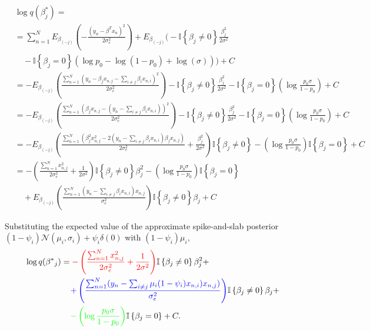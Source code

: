 \begingroup
\scriptsize
\begin{align}
    &\log q(\beta^{*}_j) = \nonumber \\
    &= \sum_{n=1}^N E_{\beta_{(-j)}} \left( - \frac{(y_n - \beta^T x_n)^2}{2 \sigma_e^2} \right) + E_{\beta_{(-j)}} \bigg( - \mathbb{I}\left\{\beta_j \ne 0\right\} \frac{\beta_j^2}{2\sigma^2} \nonumber \\
    &\quad - \mathbb{I}\left\{\beta_j = 0\right\} \left(\log p_0 - \log (1-p_0) + \log(\sigma) \right)\bigg) + C \nonumber \\
    &= - E_{\beta_{(-j)}} \left( \frac{\sum_{n=1}^N (y_n - \beta_j x_{n,j} - \sum_{i \ne j} \beta_i x_{n,i})^2}{2 \sigma_e^2} \right)  - \mathbb{I}\left\{\beta_j \ne 0\right\} \frac{\beta_j^2}{2\sigma^2} - \mathbb{I}\left\{\beta_j = 0\right\} \left(\log \frac{p_0 \sigma}{1-p_0} \right) + C \nonumber \\
    &= - E_{\beta_{(-j)}} \left( \frac{\sum_{n=1}^N (\beta_j x_{n,j} - (y_n - \sum_{i \ne j} \beta_i x_{n,i}))^2}{2 \sigma_e^2} \right)  - \mathbb{I}\left\{\beta_j \ne 0\right\} \frac{\beta_j^2}{2\sigma^2} - \mathbb{I}\left\{\beta_j = 0\right\} \left(\log \frac{p_0 \sigma}{1-p_0} \right) + C \nonumber \\
    &= - E_{\beta_{(-j)}} \left( \frac{\sum_{n=1}^N (\beta^2_j x^2_{n,j} - 2(y_n - \sum_{i \ne j} \beta_i x_{n,i})\beta_j x_{n,j})}{2 \sigma_e^2} + \frac{\beta_j^2}{2\sigma^2} \right) \mathbb{I}\left\{\beta_j \ne 0\right\} - \left(\log \frac{p_0 \sigma}{1-p_0} \right)\mathbb{I}\left\{\beta_j = 0\right\} + C \nonumber \\
    &= - \left( \frac{\sum_{n=1}^N x^2_{n,j}}{2 \sigma_e^2} + \frac{1}{2\sigma^2} \right)\mathbb{I}\left\{\beta_j \ne 0\right\}\beta_j^2  - \left(\log \frac{p_0 \sigma}{1-p_0} \right)\mathbb{I}\left\{\beta_j = 0\right\} \nonumber \\
    &\quad + E_{\beta_{(-j)}} \left( \frac{\sum_{n=1}^N (y_n - \sum_{i \ne j} \beta_i x_{n,i}) x_{n,j}}{\sigma_e^2} \right)\mathbb{I}\left\{\beta_j \ne 0\right\}\beta_j  + C
\end{align}
\endgroup

Substituting the expected value of the approximate spike-and-slab posterior $(1-\psi_i)\mathcal{N}(\mu_i, \sigma_i) + \psi_i \delta(0)$ with $(1-\psi_i)\mu_i$,
\begin{align}
   \log q(\beta^{*}{_j}) &=  {\color{red}{- \left( \frac{\sum_{n=1}^N x^2_{n,j}}{2 \sigma_e^2} + \frac{1}{2\sigma^2} \right)}}\mathbb{I}\left\{\beta_j \ne 0\right\}\beta_j^2 \nonumber +\\ & \hspace{4mm} {\color{blue}{+ \left( \frac{\sum_{n=1}^N (y_n - \sum_{i \ne j} \mu_i (1- \psi_i) x_{n,i}) x_{n,j})}{ \sigma_e^2} \right)}}\mathbb{I}\left\{\beta_j \ne 0\right\}\beta_j \nonumber +\\ & \hspace{4mm} {\color{green}{- \left(\log \frac{p_0 \sigma}{1-p_0} \right)}}\mathbb{I}\left\{\beta_j = 0\right\} + C.
\end{align}

